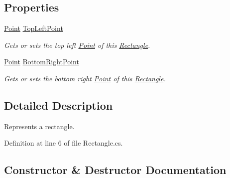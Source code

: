 \subsection*{Properties}
\begin{DoxyCompactItemize}
\item 
\mbox{\hyperlink{class_test_project_1_1_task_library_1_1_tasks_1_1_lesson1_1_1_models_1_1_point}{Point}} \mbox{\hyperlink{class_test_project_1_1_task_library_1_1_tasks_1_1_lesson1_1_1_models_1_1_rectangle_a84a6354c9a96f2d44a9787fd2138cd58}{Top\+Left\+Point}}
\begin{DoxyCompactList}\small\item\em Gets or sets the top left \mbox{\hyperlink{class_test_project_1_1_task_library_1_1_tasks_1_1_lesson1_1_1_models_1_1_point}{Point}} of this \mbox{\hyperlink{class_test_project_1_1_task_library_1_1_tasks_1_1_lesson1_1_1_models_1_1_rectangle}{Rectangle}}. \end{DoxyCompactList}\item 
\mbox{\hyperlink{class_test_project_1_1_task_library_1_1_tasks_1_1_lesson1_1_1_models_1_1_point}{Point}} \mbox{\hyperlink{class_test_project_1_1_task_library_1_1_tasks_1_1_lesson1_1_1_models_1_1_rectangle_a29e0d53ddc16899df3351aeed09a4899}{Bottom\+Right\+Point}}
\begin{DoxyCompactList}\small\item\em Gets or sets the bottom right \mbox{\hyperlink{class_test_project_1_1_task_library_1_1_tasks_1_1_lesson1_1_1_models_1_1_point}{Point}} of this \mbox{\hyperlink{class_test_project_1_1_task_library_1_1_tasks_1_1_lesson1_1_1_models_1_1_rectangle}{Rectangle}}. \end{DoxyCompactList}\end{DoxyCompactItemize}


\subsection{Detailed Description}
Represents a rectangle. 



Definition at line 6 of file Rectangle.\+cs.



\subsection{Constructor \& Destructor Documentation}
\mbox{\label{class_test_project_1_1_task_library_1_1_tasks_1_1_lesson1_1_1_models_1_1_rectangle_a733e7a90317e3682bad2cc9fd7b43b71}} 
